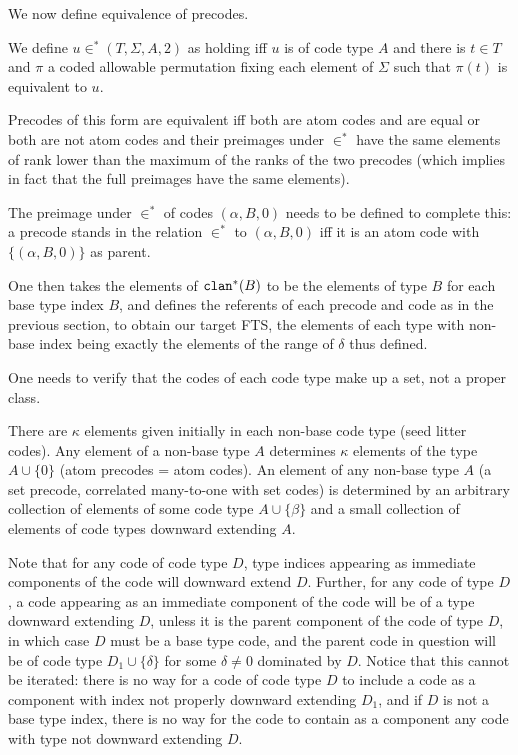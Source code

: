 \documentclass{article}
\begin{document}
\begin{description}
We now define equivalence of precodes. 

We define $u \in^* (T,\Sigma,A,2)$ as holding iff $u$ is of code type $A$ and there is $t \in T$ and $\pi$ a coded allowable permutation fixing each element of $\Sigma$ such that $\pi(t)$ is equivalent to $u$.

Precodes of this form are equivalent iff both are atom codes and are equal or both are not atom codes and their preimages under $\in^*$ have the same elements of rank lower than the maximum of the ranks of the two precodes (which implies in fact that the full preimages have the same elements).   

The preimage under $\in^*$ of codes $(\alpha,B,0)$ needs to be defined to complete this:  a precode stands in the relation $\in^*$ to  $(\alpha,B,0)$ iff
it is an atom code with $\{(\alpha,B,0)\}$ as parent.

One then takes the elements of ${\tt clan}^*(B)$ to be the elements of type $B$ for each base type index $B$, and defines the referents of each precode and code as in the previous section, to obtain our target FTS, the elements of each type with non-base index being exactly the elements of the range of $\delta$ thus defined. 

One needs to verify that the codes of each code type make up a set, not a proper class.

There are $\kappa$ elements given initially in each non-base code type (seed litter codes).  Any element of a non-base type $A$ determines $\kappa$ elements of the type $A \cup \{0\}$ (atom precodes = atom codes).   An element of any non-base type $A$ (a set precode, correlated many-to-one with set codes)  is determined by an arbitrary collection of elements of some code type $A \cup \{\beta\}$ and a small collection of elements of code types
downward extending $A$.

Note that for any code of code type $D$, type indices appearing as immediate components
of the code will downward extend $D$.  Further, for any code of type $D$, a code appearing as an immediate component of the code will be of a type downward extending $D$,
unless it is the parent component of the code of type $D$, in which case $D$ must be a base type code, and the parent code in question will be of code type $D_1\cup \{\delta\}$ for
some $\delta\neq 0$ dominated by $D$.  Notice that this cannot be iterated:  there is no way for a code of code type $D$ to include a code as a component with index not properly downward extending 
$D_1$, and if $D$ is not a base type index, there is no way for the code to contain as a component any code with type not downward extending $D$.


\end{description}
\end{document}
